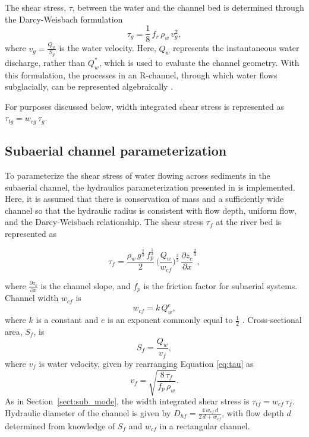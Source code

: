 \documentclass[11pt]{article}
\begin{document}
\begin{spacing}{1}
  The shear stress, $\tau$, between the water and the channel bed is determined through the Darcy-Weisbach formulation
  \begin{equation}
    \label{eq:tau}
    \tau_g=\frac{1}{8}\,f_r\,\rho_w\,v_g^2,
  \end{equation}
  where $v_g = \frac{Q_w}{S_g}$ is the water velocity.
  Here, $Q_w$ represents the instantaneous water discharge, rather than $Q_w^*$, which is used to evaluate the channel geometry.
  With this formulation, the processes in an R-channel, through which water flows subglacially, can be represented algebraically \citep{rothlisberger1972,delaney2019}.
  
  For purposes discussed below, width integrated shear stress is represented as $\tau_{tg}=w_{cg}\,\tau_g $.
  
  \subsection{Subaerial channel  parameterization}
  \label{sect:fluv}
  
  To parameterize the shear stress of water flowing across sediments in the subaerial channel,  the hydraulics parameterization presented in \citet{tucker1997} is implemented.
  Here, it is assumed that there is conservation of mass and a sufficiently wide channel so that the hydraulic radius is consistent with flow depth, uniform flow, and the Darcy-Weisbach relationship.
  The shear stress $\tau_f$ at the river bed is represented as
  \begin{linenomath*}
    \begin{equation}
      \label{eq:DW_tau}
      \tau_f=\frac{\rho_w\,g^{\frac{2}{3}}\,f_p^{\frac{1}{3}}}{2}\, \Big(\frac{Q_w}{w_{cf}} \Big)^{\frac{2}{3}} \,\frac{\partial z_c}{\partial x}^{\frac{2}{3}},
    \end{equation}
  \end{linenomath*}
  where $\frac{\partial z_c}{\partial x}$ is the channel slope, and $f_p$ is the friction factor for subaerial systems.
  Channel width $w_{cf}$ is 
  \begin{equation}
    \label{eq:wcf}
    w_{cf} = k \, Q_w^e,
  \end{equation}
  where $k$ is a constant and $e$ is an exponent commonly equal to $\frac{1}{2}$ \citep{leopold1953}.
  Cross-sectional area, $ S_f$, is 
  \begin{equation}
    \label{eq:Sf}
    S_f = \frac{Q_w}{v_f},
  \end{equation}
  where $v_f$ is water velocity, given by rearranging Equation \ref{eq:tau} as
  \begin{equation}
    \label{eq:vf}
    v_f = \sqrt{\frac{8\,\tau_f}{f_p\,\rho_w}}.
  \end{equation}
  As in Section~\ref{sect:sub_mode}, the width integrated shear stress is $\tau_{tf}=w_{cf}\,\tau_f$.
  Hydraulic diameter of the channel is given by $D_{hf} = \frac{4\,w_{cf}\,d}{2\,d+w_{cf}}$, with flow depth $d$ determined from knowledge of $S_f$ and $w_{cf}$ in a rectangular channel.
  

\end{spacing}
\end{document}
